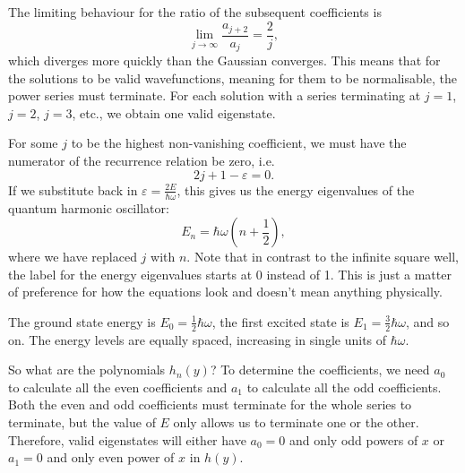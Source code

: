 \documentclass[../quantum_mechanics.tex]{subfiles}
\begin{document}
            The limiting behaviour for the ratio of the subsequent coefficients is
            \begin{equation}
                \lim_{j\to\infty}\frac{a_{j+2}}{a_j}=\frac{2}{j},
            \end{equation}
            which diverges more quickly than the Gaussian converges.
            This means that for the solutions to be valid wavefunctions, meaning for them to be normalisable, the power series must terminate.
            For each solution with a series terminating at $j=1$, $j=2$, $j=3$, etc., we obtain one valid eigenstate.

            For some $j$ to be the highest non-vanishing coefficient, we must have the numerator of the recurrence relation be zero, i.e.
            \begin{equation}
                2j+1-\varepsilon=0.
            \end{equation}
            If we substitute back in $\varepsilon=\frac{2E}{\hbar\omega}$, this gives us the energy eigenvalues of the quantum harmonic oscillator:
            \begin{equation}
                E_n=\hbar\omega\left(n+\frac{1}{2}\right),
            \end{equation}
            where we have replaced $j$ with $n$.
            Note that in contrast to the infinite square well, the label for the energy eigenvalues starts at 0 instead of 1.
            This is just a matter of preference for how the equations look and doesn't mean anything physically.

            The ground state energy is $E_0=\frac{1}{2}\hbar\omega$, the first excited state is $E_1=\frac{3}{2}\hbar\omega$, and so on.
            The energy levels are equally spaced, increasing in single units of $\hbar\omega$.

            So what are the polynomials $h_n(y)$?
            To determine the coefficients, we need $a_0$ to calculate all the even coefficients and $a_1$ to calculate all the odd coefficients.
            Both the even and odd coefficients must terminate for the whole series to terminate, but the value of $E$ only allows us to terminate one or the other.
            Therefore, valid eigenstates will either have $a_0=0$ and only odd powers of $x$ or $a_1=0$ and only even power of $x$ in $h(y)$.
\end{document}
